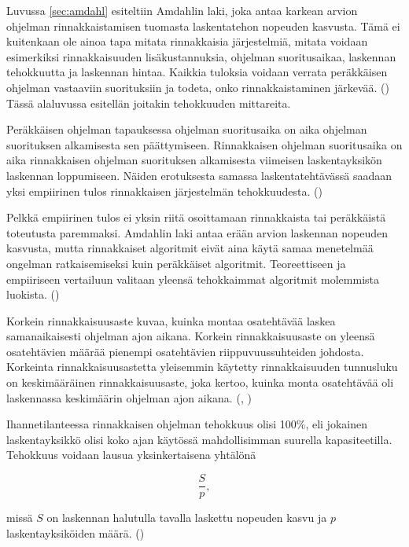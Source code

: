Luvussa \ref{sec:amdahl} esiteltiin Amdahlin laki, joka antaa karkean arvion ohjelman
rinnakkaistamisen tuomasta laskentatehon nopeuden kasvusta. Tämä ei kuitenkaan
ole ainoa tapa mitata rinnakkaisia järjestelmiä, mitata voidaan esimerkiksi
rinnakkaisuuden lisäkustannuksia, ohjelman suoritusaikaa, laskennan
tehokkuutta ja laskennan hintaa. Kaikkia tuloksia voidaan verrata peräkkäisen
ohjelman vastaaviin suorituksiin ja todeta, onko rinnakkaistaminen järkevää.
(\citealt{intro}) Tässä alaluvussa esitellän joitakin tehokkuuden mittareita.

Peräkkäisen ohjelman tapauksessa ohjelman suoritusaika on aika ohjelman
suorituksen alkamisesta sen päättymiseen. Rinnakkaisen
ohjelman suoritusaika on aika rinnakkaisen ohjelman suorituksen alkamisesta
viimeisen laskentayksikön laskennan loppumiseen. Näiden
erotuksesta samassa laskentatehtävässä saadaan yksi empiirinen tulos
rinnakkaisen järjestelmän tehokkuudesta. (\citealt{intro})

Pelkkä empiirinen tulos ei yksin riitä osoittamaan rinnakkaista tai peräkkäistä
toteutusta paremmaksi. Amdahlin laki antaa erään arvion laskennan nopeuden
kasvusta, mutta rinnakkaiset algoritmit eivät aina käytä samaa menetelmää
ongelman ratkaisemiseksi kuin peräkkäiset algoritmit. Teoreettiseen ja
empiiriseen vertailuun valitaan yleensä tehokkaimmat algoritmit molemmista
luokista. (\citealt{intro})

Korkein rinnakkaisuusaste kuvaa, kuinka montaa osatehtävää laskea samanaikaisesti
ohjelman ajon aikana. Korkein rinnakkaisuusaste on yleensä osatehtävien määrää
pienempi osatehtävien riippuvuussuhteiden johdosta. Korkeinta
rinnakkaisuusastetta yleisemmin käytetty rinnakkaisuuden tunnusluku on
keskimääräinen rinnakkaisuusaste, joka kertoo, kuinka monta osatehtävää oli
laskennassa keskimäärin ohjelman ajon aikana. (\citealt{intro}, \citealt{rauber})

Ihannetilanteessa rinnakkaisen ohjelman tehokkuus olisi 100\%, eli jokainen
laskentayksikkö olisi koko ajan käytössä mahdollisimman suurella
kapasiteetilla. Tehokkuus voidaan lausua yksinkertaisena yhtälönä

\begin{center}
\begin{equation}\frac{S}{p},\end{equation}
\end{center}

missä $S$ on laskennan halutulla tavalla laskettu nopeuden kasvu ja $p$
laskentayksiköiden määrä. (\citealt{intro})


